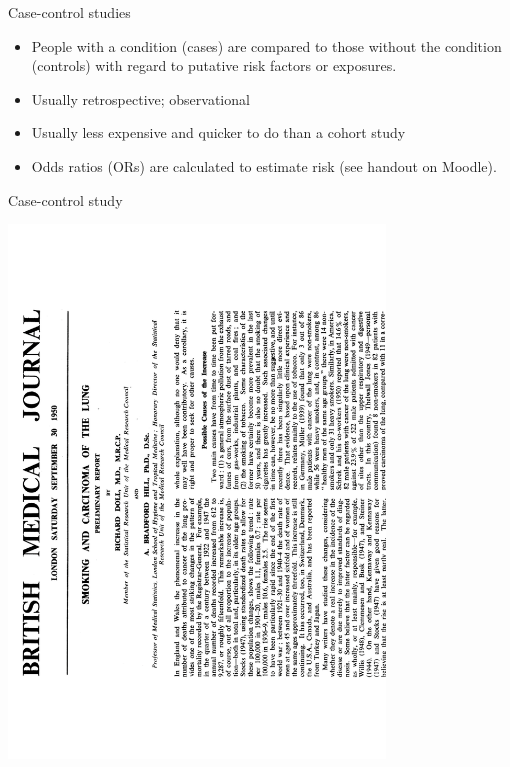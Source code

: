 \documentclass{beamer}
\begin{document}
\begin{frame}{Case-control studies}
	\begin{itemize}
	\item People with a condition (cases) are compared to those without the condition (controls) with regard to putative risk factors or exposures.
	\item Usually retrospective; observational
	\item Usually less expensive and quicker to do than a cohort study
	\item Odds ratios (ORs) are calculated to estimate risk (see handout on Moodle).
	\end{itemize}
\end{frame}

\begin{frame}{Case-control study}
\begin{center}
\includegraphics[angle=270, origin=c, width=10cm]{images/dollHill1950.pdf}
\end{center}
\end{frame}
\end{document}
